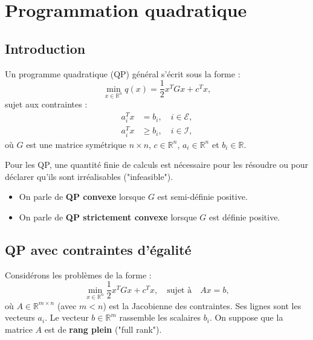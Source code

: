 \chapter{Programmation quadratique}
\label{chap:quadratic-programming}

\section{Introduction}

Un programme quadratique (QP) général s'écrit sous la forme :
\begin{equation}
    \min_{x \in \mathbb{R}^n} q(x) = \frac{1}{2} x^T G x + c^T x,
\end{equation}
sujet aux contraintes :
\begin{align}
    a_i^T x &= b_i, \quad i \in \mathcal{E}, \\
    a_i^T x &\geq b_i, \quad i \in \mathcal{I},
\end{align}
où $G$ est une matrice symétrique $n \times n$, $c \in \mathbb{R}^n$, $a_i \in \mathbb{R}^n$ et $b_i \in \mathbb{R}$.

\begin{remarque}
    Pour les QP, une quantité finie de calculs est nécessaire pour les résoudre ou pour déclarer qu'ils sont irréalisables ("infeasible").
    \begin{itemize}
        \item On parle de \textbf{QP convexe} lorsque $G$ est semi-définie positive.
        \item On parle de \textbf{QP strictement convexe} lorsque $G$ est définie positive.
    \end{itemize}
\end{remarque}

\section{QP avec contraintes d'égalité}

Considérons les problèmes de la forme :
\begin{equation}
    \min_{x \in \mathbb{R}^n} \frac{1}{2} x^T G x + c^T x, \quad \text{sujet à} \quad Ax = b,
\end{equation}
où $A \in \mathbb{R}^{m \times n}$ (avec $m < n$) est la Jacobienne des contraintes. Ses lignes sont les vecteurs $a_i$. Le vecteur $b \in \mathbb{R}^m$ rassemble les scalaires $b_i$.
On suppose que la matrice $A$ est de \textbf{rang plein} ("full rank").

